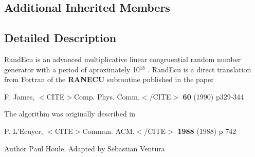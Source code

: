 \subsection*{Additional Inherited Members}


\subsection{Detailed Description}
Rand\-Ecu is an advanced multiplicative linear congruential random number generator with a period of aproximately 10$^{\mbox{18}}$ . Rand\-Ecu is a direct translation from Fortran of the {\bfseries R\-A\-N\-E\-C\-U} subroutine published in the paper

F. James, $<$\-C\-I\-T\-E$>$Comp. Phys. Comm.$<$/\-C\-I\-T\-E$>$ {\bfseries 60} (1990) p329-\/344 

The algorithm was originally described in 

P. L'Ecuyer, $<$\-C\-I\-T\-E$>$Commun. A\-C\-M.$<$/\-C\-I\-T\-E$>$ {\bfseries 1988} (1988) p 742 

\begin{DoxyAuthor}{Author}
Paul Houle. Adapted by Sebastian Ventura 
\end{DoxyAuthor}


